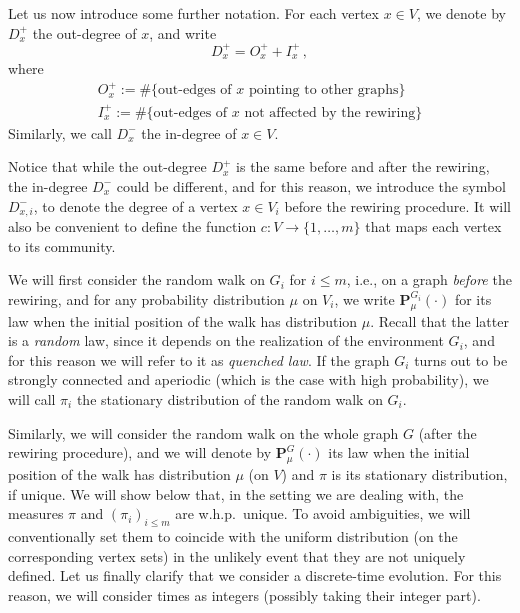 \documentclass[11pt,oneside]{amsart}
\numberwithin{equation}{section}  %
\theoremstyle{plain}
\newcommand{\whp}{{w.h.p.~}}
\newcommand{\quench}{\mathbf{P}}
\begin{document}
Let us now introduce some further notation. For each vertex $x\in V$, we denote by $D_x^+$ the out-degree of $x$,
and write
$$D_x^+=O_x^++I_x^+\,,$$
where 
\begin{equation}\nonumber
\begin{split}
O_x^+ := \#\{\mbox{out-edges of } x 
\mbox{ pointing to other graphs}\} \\
I_x^+:= \#\{\mbox{out-edges of } x 
\mbox{ not affected by the rewiring}\}
\end{split}
\end{equation}
Similarly, we call $D_x^-$ the in-degree of $x\in V$.

Notice that while the out-degree $D_x^+$ is the same before
and after the rewiring, the in-degree $D_x^-$ could be different,
and for this reason, we introduce the symbol $D_{x,i}^-$, to denote the degree of a vertex $x\in V_i$ before the rewiring procedure. %
%
It will also be convenient to define the function $c:V\to\{1,\dots, m\}$ that maps each vertex to its community.

We will first consider the random walk on $G_i$ for $i \le m$, i.e., on a graph \emph{before} the rewiring, and for any probability distribution $\mu$ on $V_i$, we write $\quench_\mu^{G_i}(\cdot)$ for its law when the initial position of the walk has distribution $\mu$. Recall that the latter is a \emph{random} law, since it depends on the realization of the environment $G_i$, and for this reason we will refer to it as \emph{quenched law}. If the graph $G_i$ turns out to be strongly connected and aperiodic (which is the case with high probability), we will call $\pi_i$ the stationary distribution of the random walk on $G_i$. 

Similarly, we will consider the random walk on the whole graph $G$ (after the rewiring procedure), and we will denote by $\quench_\mu^{G}(\cdot)$ its law when the initial position of the walk has distribution $\mu$ (on $V$) and $\pi$ is its stationary distribution, if unique.
We will show below that, in the setting we are dealing with, the measures $\pi$ and $(\pi_i)_{i \le m}$ are \whp unique.
To avoid ambiguities, we will conventionally set them to coincide with the uniform distribution (on the corresponding vertex sets) in the unlikely event that they are not uniquely defined.
Let us finally clarify that we consider a discrete-time evolution. For this reason, we will consider times as integers (possibly taking their integer part).
\end{document}
